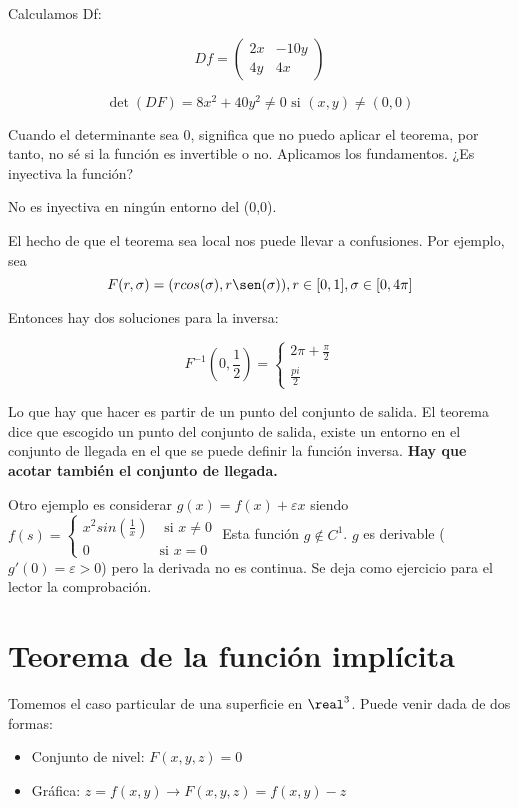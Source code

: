 Calculamos Df:

$$Df = \begin{pmatrix}
        2x&-10y\\
        4y & 4x 
       \end{pmatrix}
$$

$$\det(DF) = 8x^2 + 40y^2 \neq 0 \text{ si } (x,y) \neq (0,0)$$

Cuando el determinante sea 0, significa que no puedo aplicar el teorema, por tanto, no sé si la función es invertible o no. Aplicamos los fundamentos. ¿Es inyectiva la función?

No es inyectiva en ningún entorno del (0,0).

El hecho de que el teorema sea local nos puede llevar a confusiones. Por ejemplo, sea \[ F (r,\sigma) = (rcos(\sigma),r\sen(\sigma)), r \in [0,1], \sigma \in [0,4\pi]\]

Entonces hay dos soluciones para la inversa:

\[ F^{-1} (0,\frac{1}{2}) = \left\{\begin{matrix}2\pi+\frac{\pi}{2}\\\frac{pi}{2}\end{matrix}\right. \]

Lo que hay que hacer es partir de un punto del conjunto de salida. El teorema dice que escogido un punto del conjunto de salida, existe un entorno en el conjunto de llegada en el que se puede definir la función inversa. \textbf{Hay que acotar también el conjunto de llegada.}

Otro ejemplo es considerar  $g(x) = f(x) + \varepsilon x$ siendo $f(s) =\left\{\begin{matrix}x^2sin\left(\frac{1}{x}\right)& \text{ si } x\neq0\\0 &\text{si } x=0\end{matrix}\right.$
Esta función $g \notin C^1$. $g$ es derivable ($g'(0) = \varepsilon>0$) pero la derivada no es continua. Se deja como ejercicio para el lector la comprobación.      

\section{Teorema de la función implícita}

Tomemos el caso particular de una superficie en $\real^3$. Puede venir dada de dos formas:
\begin{itemize}
 \item Conjunto de nivel: $F(x,y,z) = 0$
 \item Gráfica: $z=f(x,y) \rightarrow F(x,y,z) = f(x,y)-z$
\end{itemize}

